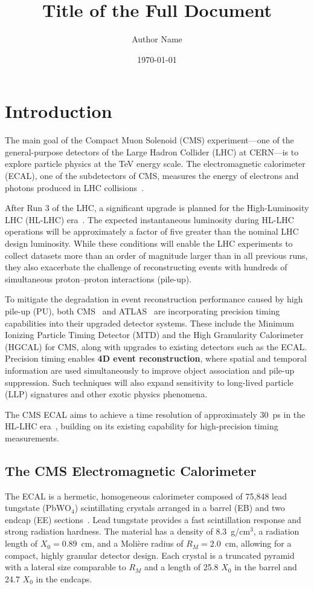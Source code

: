 \documentclass[12pt,a4paper]{article}
\title{Title of the Full Document}
\author{Author Name}
\date{\today}
\begin{document}
\maketitle

\section{Introduction}
The main goal of the Compact Muon Solenoid (CMS) experiment---one of the general-purpose detectors of the Large Hadron Collider (LHC) at CERN---is to explore particle physics at the TeV energy scale. The electromagnetic calorimeter (ECAL), one of the subdetectors of CMS, measures the energy of electrons and photons produced in LHC collisions~\cite{CMS:2008xjf}.

After Run 3 of the LHC, a significant upgrade is planned for the High-Luminosity LHC (HL-LHC) era~\cite{Apollinari:2015wtw}. The expected instantaneous luminosity during HL-LHC operations will be approximately a factor of five greater than the nominal LHC design luminosity. While these conditions will enable the LHC experiments to collect datasets more than an order of magnitude larger than in all previous runs, they also exacerbate the challenge of reconstructing events with hundreds of simultaneous proton--proton interactions (pile-up).

To mitigate the degradation in event reconstruction performance caused by high pile-up (PU), both CMS~\cite{Butler:2019rpu} and ATLAS~\cite{Morgenstern:2019xto} are incorporating precision timing capabilities into their upgraded detector systems. These include the Minimum Ionizing Particle Timing Detector (MTD) and the High Granularity Calorimeter (HGCAL) for CMS, along with upgrades to existing detectors such as the ECAL. Precision timing enables \textbf{4D event reconstruction}, where spatial and temporal information are used simultaneously to improve object association and pile-up suppression. Such techniques will also expand sensitivity to long-lived particle (LLP) signatures and other exotic physics phenomena.

The CMS ECAL aims to achieve a time resolution of approximately 30~ps in the HL-LHC era~\cite{Bruneliere:2006ra}, building on its existing capability for high-precision timing measurements.

\subsection{The CMS Electromagnetic Calorimeter}
The ECAL is a hermetic, homogeneous calorimeter composed of 75,848 lead tungstate (PbWO$_4$) scintillating crystals arranged in a barrel (EB) and two endcap (EE) sections~\cite{CMS:1997ema}. Lead tungstate provides a fast scintillation response and strong radiation hardness. The material has a density of 8.3~g/cm$^3$, a radiation length of $X_0 = 0.89$~cm, and a Moli\`ere radius of $R_M = 2.0$~cm, allowing for a compact, highly granular detector design. Each crystal is a truncated pyramid with a lateral size comparable to $R_M$ and a length of 25.8 $X_0$ in the barrel and 24.7 $X_0$ in the endcaps.
\end{document}
